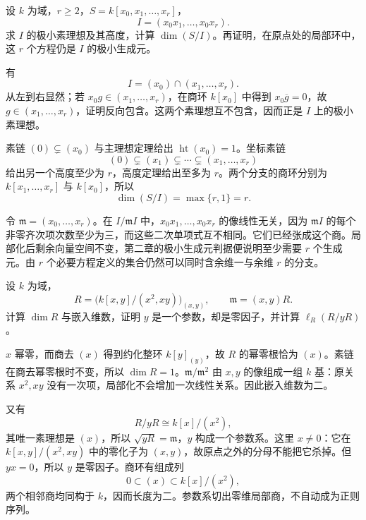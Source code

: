 \begin{exercise}\label{g5:ex:mixed-codimension-equations}
	设 \(k\) 为域，\(r\geq2\)，\(S=k[x_0,x_1,\ldots,x_r]\)，
	\[
		I=(x_0x_1,\ldots,x_0x_r).
	\]
	求 \(I\) 的极小素理想及其高度，计算 \(\dim(S/I)\)。再证明，在原点处的局部环中，这 \(r\) 个方程仍是 \(I\) 的极小生成元。
\end{exercise}
\begin{solution}
	有
	\[
		I=(x_0)\cap(x_1,\ldots,x_r).
	\]
	从左到右显然；若 \(x_0g\in(x_1,\ldots,x_r)\)，在商环 \(k[x_0]\) 中得到 \(x_0\overline g=0\)，故 \(g\in(x_1,\ldots,x_r)\)，证明反向包含。这两个素理想互不包含，因而正是 \(I\) 上的极小素理想。

	素链 \((0)\subsetneq(x_0)\) 与主理想定理给出 \(\operatorname{ht}(x_0)=1\)。坐标素链
	\[
		(0)\subsetneq(x_1)\subsetneq\cdots\subsetneq(x_1,\ldots,x_r)
	\]
	给出另一个高度至少为 \(r\)，高度定理给出至多为 \(r\)。两个分支的商环分别为 \(k[x_1,\ldots,x_r]\) 与 \(k[x_0]\)，所以
	\[
		\dim(S/I)=\max\{r,1\}=r.
	\]

	令 \(\mathfrak m=(x_0,\ldots,x_r)\)。在 \(I/\mathfrak mI\) 中，\(x_0x_1,\ldots,x_0x_r\) 的像线性无关，因为 \(\mathfrak mI\) 的每个非零齐次项次数至少为三，而这些二次单项式互不相同。它们已经张成这个商。局部化后剩余向量空间不变，第二章的极小生成元判据便说明至少需要 \(r\) 个生成元。由 \(r\) 个必要方程定义的集合仍然可以同时含余维一与余维 \(r\) 的分支。
\end{solution}

\begin{exercise}\label{g5:ex:parameter-zero-divisor}
	设 \(k\) 为域，
	\[
		R=\bigl(k[x,y]/(x^2,xy)\bigr)_{(x,y)},\qquad
		\mathfrak m=(x,y)R.
	\]
	计算 \(\dim R\) 与嵌入维数，证明 \(y\) 是一个参数，却是零因子，并计算 \(\ell_R(R/yR)\)。
\end{exercise}
\begin{solution}
	\(x\) 幂零，而商去 \((x)\) 得到约化整环 \(k[y]_{(y)}\)，故 \(R\) 的幂零根恰为 \((x)\)。素链在商去幂零根时不变，所以 \(\dim R=1\)。\(\mathfrak m/\mathfrak m^2\) 由 \(x,y\) 的像组成一组 \(k\) 基：原关系 \(x^2,xy\) 没有一次项，局部化不会增加一次线性关系。因此嵌入维数为二。

	又有
	\[
		R/yR\cong k[x]/(x^2),
	\]
	其唯一素理想是 \((x)\)，所以 \(\sqrt{yR}=\mathfrak m\)，\(y\) 构成一个参数系。这里 \(x\ne0\)：它在 \(k[x,y]/(x^2,xy)\) 中的零化子为 \((x,y)\)，故原点之外的分母不能把它杀掉。但 \(yx=0\)，所以 \(y\) 是零因子。商环有组成列
	\[
		0\subset (x)\subset k[x]/(x^2),
	\]
	两个相邻商均同构于 \(k\)，因而长度为二。参数系切出零维局部商，不自动成为正则序列。
\end{solution}

